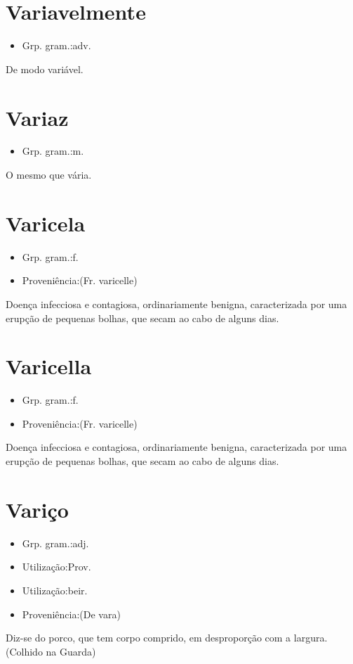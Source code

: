 \documentclass{article}
\begin{document}
\section{Variavelmente}
\begin{itemize}
\item {Grp. gram.:adv.}
\end{itemize}
De modo variável.
\section{Variaz}
\begin{itemize}
\item {Grp. gram.:m.}
\end{itemize}
O mesmo que \textunderscore vária\textunderscore .
\section{Varicela}
\begin{itemize}
\item {Grp. gram.:f.}
\end{itemize}
\begin{itemize}
\item {Proveniência:(Fr. \textunderscore varicelle\textunderscore )}
\end{itemize}
Doença infecciosa e contagiosa, ordinariamente benigna, caracterizada por uma erupção de pequenas bolhas, que secam ao cabo de alguns dias.
\section{Varicella}
\begin{itemize}
\item {Grp. gram.:f.}
\end{itemize}
\begin{itemize}
\item {Proveniência:(Fr. \textunderscore varicelle\textunderscore )}
\end{itemize}
Doença infecciosa e contagiosa, ordinariamente benigna, caracterizada por uma erupção de pequenas bolhas, que secam ao cabo de alguns dias.
\section{Variço}
\begin{itemize}
\item {Grp. gram.:adj.}
\end{itemize}
\begin{itemize}
\item {Utilização:Prov.}
\end{itemize}
\begin{itemize}
\item {Utilização:beir.}
\end{itemize}
\begin{itemize}
\item {Proveniência:(De \textunderscore vara\textunderscore )}
\end{itemize}
Diz-se do porco, que tem corpo comprido, em desproporção com a largura. (Colhido na Guarda)
\end{document}
